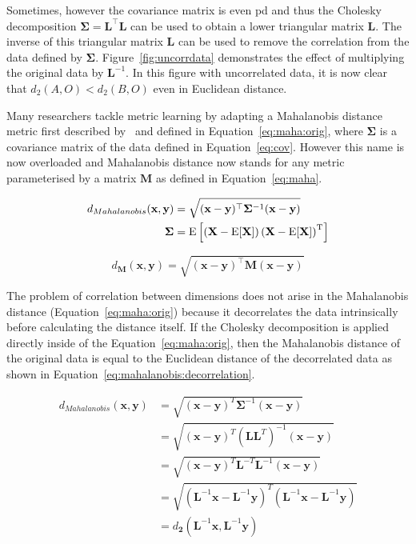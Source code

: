 Sometimes, however the covariance matrix is even \ac{pd} and thus the Cholesky decomposition $\bm{\Sigma}=\bm{L}^\top\bm{L}$ can be used to obtain a lower triangular matrix $\bm{L}$. The inverse of this triangular matrix $\bm{L}$ can be used to remove the correlation from the data defined by $\bm{\Sigma}$. Figure~\ref{fig:uncorrdata} demonstrates the effect of multiplying the original data by $\bm{L}^{-1}$. In this figure with uncorrelated data, it is now clear that $d_2(A,O)<d_2(B,O)$ even in Euclidean distance.


Many researchers tackle metric learning by adapting a Mahalanobis distance metric first described by~\citep{mahalanobis1936generalized} and defined in Equation~\ref{eq:maha:orig}, where $\bm{\Sigma}$ is a covariance matrix of the data defined in Equation~\ref{eq:cov}. However this name is now overloaded and Mahalanobis distance now stands for any metric parameterised by a matrix $\bm{M}$ as defined in Equation~\ref{eq:maha}.

\begin{align} \label{eq:maha:orig}
d_{Mahalanobis}(\textbf{x},\textbf{y}) &= \sqrt{(\textbf{x}-\textbf{y})^\top\bm{\Sigma}^{-1}(\textbf{x}-\textbf{y})}  \\
\bm{\Sigma} &= \mathrm {E} \left[\left(\mathbf {X} -\mathrm {E} [\mathbf {X} ]\right)\left(\mathbf {X} -\mathrm {E} [\mathbf {X} ]\right)^{\rm {T}}\right] \label{eq:cov}
\end{align}

\begin{equation} \label{eq:maha}
d_{\bm{M}}(\textbf{x},\textbf{y}) = \sqrt{(\textbf{x}-\textbf{y})^\top\bm{M}(\textbf{x}-\textbf{y})} 
\end{equation}

The problem of correlation between dimensions does not arise in the Mahalanobis distance (Equation~\ref{eq:maha:orig}) because it decorrelates the data intrinsically before calculating the distance itself. If the Cholesky decomposition is applied directly inside of the Equation~\ref{eq:maha:orig}, then the Mahalanobis distance of the original data is equal to the Euclidean distance of the decorrelated data as shown in Equation~\ref{eq:mahalanobis:decorrelation}.

\begin{align}
  d_{Mahalanobis}(\textbf{x},\textbf{y}) &= \sqrt{(\textbf{x}-\textbf{y})^{T}\bm{\Sigma}^{-1}(\textbf{x}-\textbf{y})} \nonumber\\
         &= \sqrt{(\textbf{x}-\textbf{y})^{T}(\bm{L}\bm{L}^{T})^{-1}(\textbf{x}-\textbf{y})} \nonumber\\
         &= \sqrt{(\textbf{x}-\textbf{y})^{T}\bm{L}^{-T}\bm{L}^{-1}(\textbf{x}-\textbf{y})} \nonumber\\
         &= \sqrt{(\bm{L}^{-1}\textbf{x}-\bm{L}^{-1}\textbf{y})^{T}(\bm{L}^{-1}\textbf{x}-\bm{L}^{-1}\textbf{y})} \nonumber\\
         &= d_{\bm{2}}(\bm{L}^{-1}\textbf{x}, \bm{L}^{-1}\textbf{y}) \label{eq:mahalanobis:decorrelation}
\end{align}

